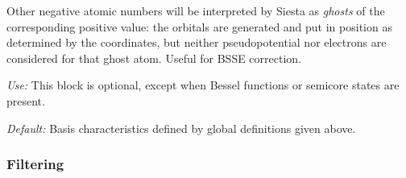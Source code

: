 \documentclass[11pt]{article}
\begin{document}
\begin{description}
Other negative atomic numbers will be interpreted by {\sc Siesta} as
{\it ghosts}
of the corresponding positive value: the orbitals
are generated and put in position as determined by the coordinates,
but neither pseudopotential nor electrons are considered for that
ghost atom. Useful for BSSE correction.

{\it Use:} This block is optional, except when Bessel functions or
semicore states are present.

{\it Default:} Basis characteristics defined by global definitions given
above.

\end{description}

\subsubsection{Filtering}
\label{sec:filtering}
\end{document}

